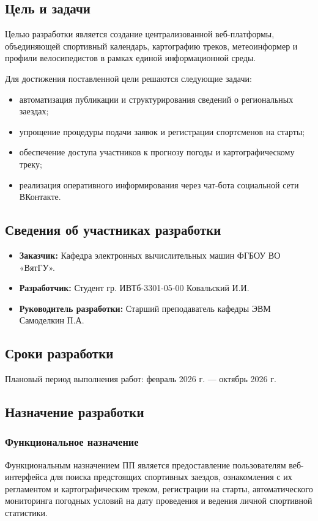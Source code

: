 \documentclass[a4paper,12pt]{article}
\begin{document}
\subsection{Цель и задачи}
Целью разработки является создание централизованной веб-платформы, объединяющей спортивный календарь, картографию треков, метеоинформер и профили велосипедистов в рамках единой информационной среды.

Для достижения поставленной цели решаются следующие задачи:
\begin{itemize}
	\item автоматизация публикации и структурирования сведений о региональных заездах;
	\item упрощение процедуры подачи заявок и регистрации спортсменов на старты;
	\item обеспечение доступа участников к прогнозу погоды и картографическому треку;
	\item реализация оперативного информирования через чат-бота социальной сети ВКонтакте.
\end{itemize}

\subsection{Сведения об участниках разработки}
\begin{itemize}
	\item \textbf{Заказчик:} Кафедра электронных вычислительных машин ФГБОУ ВО «ВятГУ».
	\item \textbf{Разработчик:} Студент гр. ИВТб-3301-05-00 Ковальский И.И.
	\item \textbf{Руководитель разработки:} Старший преподаватель кафедры ЭВМ Самоделкин П.А.
\end{itemize}

\subsection{Сроки разработки}
Плановый период выполнения работ: февраль 2026 г. — октябрь 2026 г.

\subsection{Назначение разработки}
\subsubsection{Функциональное назначение}
Функциональным назначением ПП является предоставление пользователям веб-интерфейса для поиска предстоящих спортивных заездов, ознакомления с их регламентом и картографическим треком, регистрации на старты, автоматического мониторинга погодных условий на дату проведения и ведения личной спортивной статистики.
\end{document}
